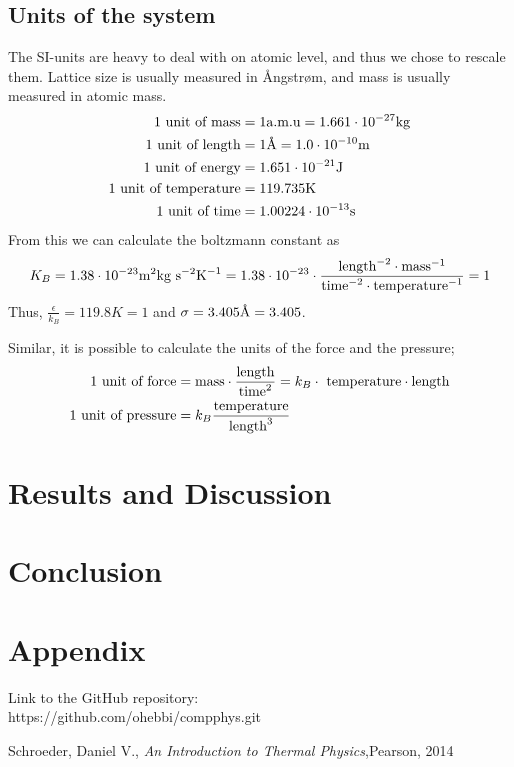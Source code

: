 \documentclass{article}
\begin{document}
\subsection{Units of the system}

The SI-units are heavy to deal with on atomic level, and thus we chose to rescale them. Lattice size is usually measured in Ångstrøm, and mass is usually measured in atomic mass.
\begin{align}
	1 \textnormal{ unit of mass} &= 1 \textnormal{a.m.u} = 1.661\cdot 10^{-27} \textnormal{kg}\\
	1 \textnormal{ unit of length} &= 1 \textnormal{Å} = 1.0\cdot 10^{-10} \textnormal{m}\\
	1 \textnormal{ unit of energy} &= 1.651\cdot 10^{-21}\textnormal{J}\\
	1 \textnormal{ unit of temperature} &= 119.735\textnormal{K}\\
	1 \textnormal{ unit of time} &= 1.00224\cdot 10^{-13} \textnormal{s}
\end{align}
From this we can calculate the boltzmann constant as
\begin{align}
	K_B = 1.38\cdot 10^{-23} \textnormal{m}^2\textnormal{kg}\textnormal{ s}^{-2}\textnormal{K}^{-1}= 1.38\cdot 10^{-23} \cdot \frac{\textnormal{length}^{-2}\cdot\textnormal{mass}^{-1}}{\textnormal{time}^{-2}\cdot\textnormal{temperature}^{-1}}=1
\end{align}
Thus, $\frac{\epsilon}{k_B}=119.8K=1$ and $\sigma = 3.405 \textnormal{Å}= 3.405$.

Similar, it is possible to calculate the units of the force and the pressure;
\begin{align}
	\textnormal{1 unit of force} &= \textnormal{mass}\cdot\frac{\textnormal{length}}{\textnormal{time}^2} = k_B \cdot \textnormal{ temperature}\cdot\textnormal{length}\\
	\textnormal{1 unit of pressure} &=k_B \frac{\textnormal{temperature}}{\textnormal{length}^3}
\end{align}


\section{Results and Discussion}





\section{Conclusion}


\section{Appendix}
Link to the GitHub repository:\\

https://github.com/ohebbi/compphys.git

\begin{thebibliography}{}
Schroeder, Daniel V., \textit{An Introduction to Thermal Physics},Pearson, 2014\\
\end{thebibliography}
\end{document}
